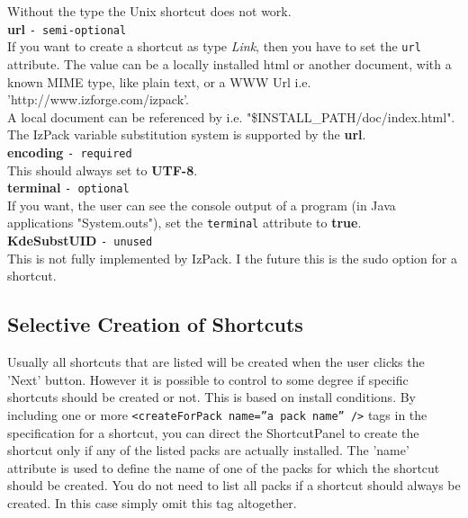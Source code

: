 Without the type the Unix shortcut does not work.\\

\textbf{url} \texttt{- semi-optional}\\

If you want to create a shortcut as type \textit{Link}, then you have
to set the \texttt{url} attribute. The value can be a locally installed
html or another document, with a known MIME type, like plain text,
or a WWW Url i.e. 'http://www.izforge.com/izpack'.\\

A local document can be referenced by i.e. "\$INSTALL\_PATH/doc/index.html".\\

The IzPack variable substitution system is supported by the \textbf{url}.\\

\textbf{encoding} \texttt{- required}\\

This should always set to \textbf{UTF-8}.\\

\textbf{terminal} \texttt{- optional}\\

If you want, the user can see the console output of a program
(in Java applications "System.outs"), set the \texttt{terminal} attribute to \textbf{true}.\\

\textbf{KdeSubstUID} \texttt{- unused}\\

This is not fully implemented by IzPack.
I the future this is the sudo option for a shortcut.\\

\subsection{Selective Creation of Shortcuts}

Usually all shortcuts that are listed will be created when the user
clicks the 'Next' button. However it is possible to
control to some degree if specific shortcuts should be created or
not. This is based on install conditions. By including one or more
\texttt{<createForPack name=''a pack name'' />} tags in the
specification for a shortcut, you can direct the ShortcutPanel to
create the shortcut only if any of the listed packs are actually
installed. The 'name' attribute is used to define the name of one of
the packs for which the shortcut should be created. You do not need to
list all packs if a shortcut should always be created. In this case
simply omit this tag altogether.\\

